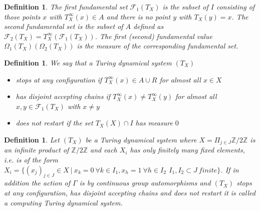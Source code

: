 \documentclass[12pt,a4paper]{scrartcl}
\newtheorem{Definition}[Theorem]{Definition}
\numberwithin{equation}{section}
\newcommand{\2}{\mathbb{Z} / 2 \mathbb{Z}}
\newcommand{\1}{\bar{1}}
\newcommand{\0}{\bar{0}}
\begin{document}
\begin{Definition}
	The first fundamental set $\mathcal{F}_1(T_X)$ is the subset of $I$ consisting of those points $x$ with $T_X^\infty(x) \in A$ and there is no point $y$ with $T_X(y)=x$. The second fundamental set is the subset of $A$ defined as $\mathcal{F}_2(T_X)=T_X^\infty(\mathcal{F}_1(T_X))$. The first (second) fundamental value $\Omega_1(T_X) ( \Omega_2(T_X))$ is the measure of the corresponding fundamental set.
\end{Definition}

\begin{Definition}
	We say that a Turing dynamical system $(T_X)$
	\begin{itemize}
		\item stops at any configuration if $T_X^\infty (x) \in A \cup R$ for almost all $x \in X$
		\item has disjoint accepting chains if $T_X^\infty (x) \neq T_X^\infty (y)$ for almost all $x, y \in \mathcal{F}_1(T_X)$ with $x \neq y$
		\item does not restart if the set $T_X(X) \cap I$ has measure $0$
	\end{itemize}
\end{Definition}
 
 
\begin{Definition}
	Let $(T_X)$ be a Turing dynamical system where $X = \Pi_{j \in J} \2$ is an infinite product of $\2$ and each $X_i$  has only finitely many fixed elements, i.e. is of the form $X_i = \{(x_j)_{j \in J} \in X \ | \ x_k = 0 \ \forall k \in I_1, x_h = 1 \ \forall h \in I_2\, \ I_1, I_2 \subset J \ finite\}$. If in addition the action of $\Gamma$ is by continuous group automorphisms and $(T_X)$ stops at any configuration, has disjoint accepting chains and does not restart it is called a computing Turing dynamical system.
\end{Definition}
\end{document}
